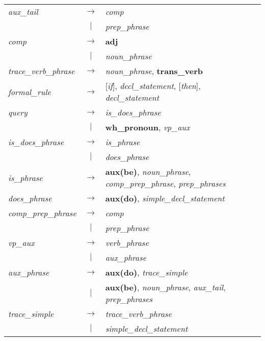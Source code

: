 \begin{tabular}{lcl}
{\sl aux\_tail\/} & $\rightarrow$ & {\sl comp\/} \\
& $|$ & {\sl prep\_phrase\/} \\
{\sl comp\/} & $\rightarrow$ & {\bf adj} \\
& $|$ & {\sl noun\_phrase\/} \\
{\sl trace\_verb\_phrase\/} & $\rightarrow$ & {\sl noun\_phrase\/},
{\bf trans\_verb} \\
{\sl formal\_rule\/} & $\rightarrow$ & [{\sl if\/}], {\sl
decl\_statement\/}, [{\sl then\/}], {\sl decl\_statement\/} \\
{\sl query\/} & $\rightarrow$ & {\sl is\_does\_phrase\/} \\
& $|$ & {\bf wh\_pronoun}, {\sl vp\_aux\/} \\
{\sl is\_does\_phrase\/} & $\rightarrow$ & {\sl is\_phrase\/} \\
& $|$ & {\sl does\_phrase\/} \\
{\sl is\_phrase\/} & $\rightarrow$ & {\bf aux(be)}, {\sl
noun\_phrase\/}, {\sl comp\_prep\_phrase\/}, {\sl prep\_phrases\/} \\
{\sl does\_phrase\/} & $\rightarrow$ & {\bf aux(do)}, {\sl
simple\_decl\_statement\/} \\
{\sl comp\_prep\_phrase\/} & $\rightarrow$ & {\sl comp\/} \\ 
& $|$ & {\sl prep\_phrase\/} \\
{\sl vp\_aux\/} & $\rightarrow$ & {\sl verb\_phrase\/} \\
& $|$ & {\sl aux\_phrase\/} \\
{\sl aux\_phrase\/} & $\rightarrow$ & {\bf aux(do)}, {\sl
trace\_simple\/} \\
& $|$ & {\bf aux(be)}, {\sl noun\_phrase\/}, {\sl aux\_tail\/}, {\sl
prep\_phrases\/} \\
{\sl trace\_simple\/} & $\rightarrow$ & {\sl trace\_verb\_phrase\/} \\
& $|$ & {\sl simple\_decl\_statement\/}
\end{tabular}



